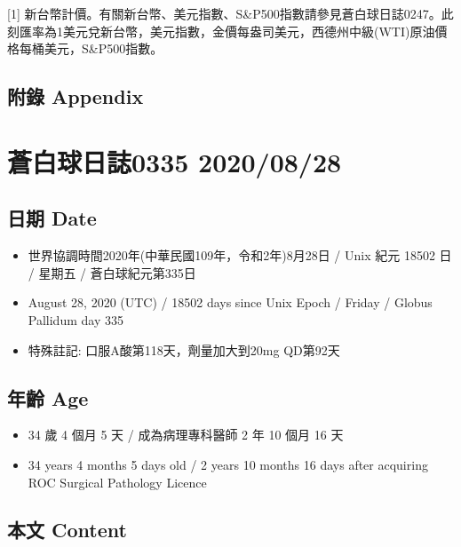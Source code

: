 \documentclass[a5paper, 11pt
]{book}
\providecommand{\tightlist}{%
  \setlength{\itemsep}{0pt}\setlength{\parskip}{0pt}}
\begin{document}
{[}1{]}
新台幣計價。有關新台幣、美元指數、S\&P500指數請參見蒼白球日誌0247。此刻匯率為1美元兌新台幣，美元指數，金價每盎司美元，西德州中級(WTI)原油價格每桶美元，S\&P500指數。

\hypertarget{ux9644ux9304-appendix-87}{%
\subsection{附錄 Appendix}\label{ux9644ux9304-appendix-87}}

\hypertarget{ux84bcux767dux7403ux65e5ux8a8c0335-20200828}{%
\section{蒼白球日誌0335
2020/08/28}\label{ux84bcux767dux7403ux65e5ux8a8c0335-20200828}}

\hypertarget{ux65e5ux671f-date-88}{%
\subsection{日期 Date}\label{ux65e5ux671f-date-88}}

\begin{itemize}
\tightlist
\item
  世界協調時間2020年(中華民國109年，令和2年)8月28日 / Unix 紀元 18502 日
  / 星期五 / 蒼白球紀元第335日
\item
  August 28, 2020 (UTC) / 18502 days since Unix Epoch / Friday / Globus
  Pallidum day 335
\item
  特殊註記: 口服A酸第118天，劑量加大到20mg QD第92天
\end{itemize}

\hypertarget{ux5e74ux9f61-age-88}{%
\subsection{年齡 Age}\label{ux5e74ux9f61-age-88}}

\begin{itemize}
\tightlist
\item
  34 歲 4 個月 5 天 / 成為病理專科醫師 2 年 10 個月 16 天
\item
  34 years 4 months 5 days old / 2 years 10 months 16 days after
  acquiring ROC Surgical Pathology Licence
\end{itemize}

\hypertarget{ux672cux6587-content-88}{%
\subsection{本文 Content}\label{ux672cux6587-content-88}}
\end{document}
